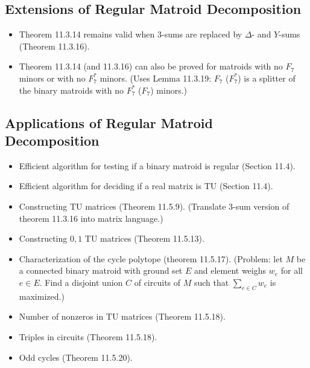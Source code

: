 \subsection{Extensions of Regular Matroid Decomposition}

\begin{itemize}
  \item Theorem 11.3.14 remains valid when $3$-sums are replaced by $\Delta$- and $Y$-sums (Theorem 11.3.16).
  \item Theorem 11.3.14 (and 11.3.16) can also be proved for matroids with no $F_{7}$ minors or with no $F_{7}^{*}$ minors. (Uses Lemma 11.3.19: $F_{7}$ ($F_{7}^{*}$) is a splitter of the binary matroids with no $F_{7}^{*}$ ($F_{7}$) minors.)
\end{itemize}


\subsection{Applications of Regular Matroid Decomposition}

\begin{itemize}
  \item Efficient algorithm for testing if a binary matroid is regular (Section 11.4).
  \item Efficient algorithm for deciding if a real matrix is TU (Section 11.4).
  \item Constructing TU matrices (Theorem 11.5.9). (Translate $3$-sum version of theorem 11.3.16 into matrix language.)
  \item Constructing ${0, 1}$ TU matrices (Theorem 11.5.13).
  \item Characterization of the cycle polytope (theorem 11.5.17). (Problem: let $M$ be a connected binary matroid with ground set $E$ and element weighs $w_{e}$ for all $e \in E$. Find a disjoint union $C$ of circuits of $M$ such that $\sum_{e \in C} w_{e}$ is maximized.)
  \item Number of nonzeros in TU matrices (Theorem 11.5.18).
  \item Triples in circuits (Theorem 11.5.18).
  \item Odd cycles (Theorem 11.5.20).
\end{itemize}
